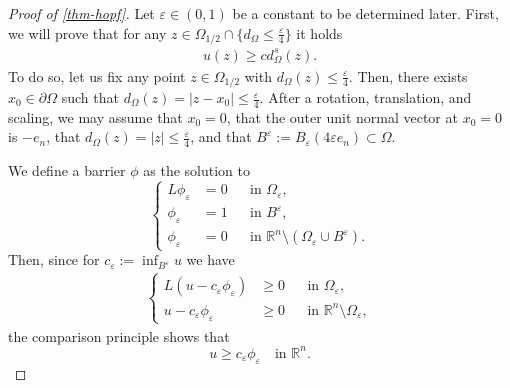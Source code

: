 \documentclass[11pt,reqno]{amsart}
\theoremstyle{plain}
\theoremstyle{definition}
\numberwithin{equation}{section}
\newcommand{\R}{\mathbb{R}}
\newcommand{\eps}{\varepsilon}
\newcommand{\1}{\mathbbm{1}}
\begin{document}
\begin{proof}[Proof of \autoref{thm-hopf}]
Let $\varepsilon \in (0,1)$ be a constant to be determined later.
First, we will prove that for any $z \in \Omega_{1/2} \cap \{ d_{\Omega} \le \frac{\eps}{4} \}$ it holds
\begin{align}
\label{eq:Hopf-proof-boundary}
    u(z) \ge c d_{\Omega}^s(z).
\end{align}
To do so, let us fix any point $z \in \Omega_{1/2}$ with $d_\Omega(z) \leq \frac{\varepsilon}{4}$. Then, there exists $x_0 \in \partial \Omega$ such that $d_\Omega(z)=|z-x_0| \leq \frac{\varepsilon}{4}$. After a rotation,  translation, and scaling, we may assume that $x_0=0$, that the outer unit normal vector at $x_0 = 0$ is $-e_n$, that $d_\Omega(z)=|z|\leq \frac{\varepsilon}{4}$, and that $B^{\eps} :=B_{\eps}(4\eps e_n) \subset \Omega$. 

We define a barrier $\phi$ as the solution to
\begin{equation*}
\left\{
\begin{aligned}
L\phi_{\eps}&=0 &&\text{in }\Omega_{\eps}, \\
\phi_{\eps}&=1 &&\text{in }B^{\eps}, \\
\phi_{\eps}&=0 &&\text{in }\R^n \setminus (\Omega_{\eps} \cup B^{\eps}).
\end{aligned}
\right.
\end{equation*}
Then, since for $c_{\eps} :=\inf_{B^{\eps}} u$ we have
\begin{align*}
\left\{
\begin{aligned}
L(u-c_{\eps}\phi_{\eps}) &\geq 0 &&\text{in }\Omega_{\eps}, \\
u-c_{\eps} \phi_{\eps} &\geq 0 &&\text{in } \R^n \setminus \Omega_{\eps},
\end{aligned}
\right.
\end{align*}
the comparison principle shows that
\begin{equation*}
u \geq c_{\eps} \phi_{\eps} \quad\text{in }\R^n.
\end{equation*}


\end{proof}
\end{document}
